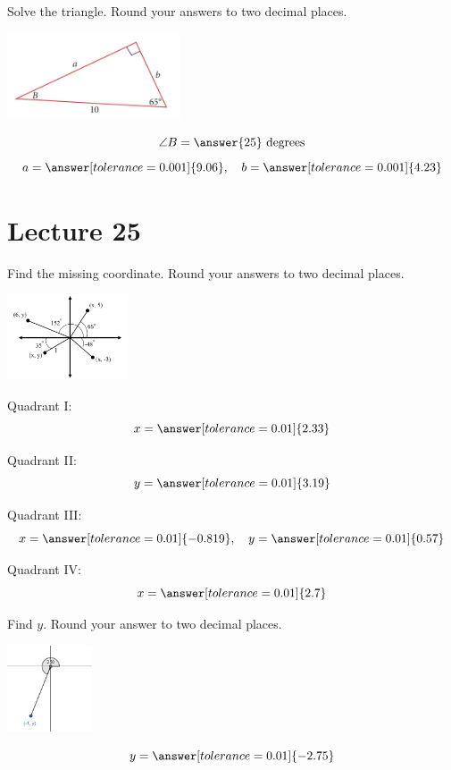 \documentclass{ximera}
\begin{document}
\begin{problem}\label{prob:160hom10prob6}
Solve the triangle. Round your answers to two decimal places.
\begin{image}
   
\includegraphics[height=1in]{160H10pic4.jpg}~
 
\end{image}

$$\angle B=\answer{25}\mbox{ degrees}$$
$$a=\answer[tolerance=0.001]{9.06},\quad b=\answer[tolerance=0.001]{4.23}$$
\end{problem}

\section{Lecture 25}

\begin{problem}\label{prob:160hom10prob7}
Find the missing coordinate.  Round your answers to two decimal places.
\begin{image}
   
\includegraphics[height=1in]{160H10pic2.jpg}~
 
\end{image}

Quadrant I:
$$x=\answer[tolerance=0.01]{2.33}$$

Quadrant II:
$$y=\answer[tolerance=0.01]{3.19}$$

Quadrant III:
$$x=\answer[tolerance=0.01]{-0.819},\quad y=\answer[tolerance=0.01]{0.57}$$

Quadrant IV:
$$x=\answer[tolerance=0.01]{2.7}$$
\end{problem}

\begin{problem}\label{prob:160hom10prob8}
Find $y$.  Round your answer to two decimal places.
 
 \begin{image}
   
\includegraphics[height=1in]{160H10pic1.jpg}

\end{image}
$$y=\answer[tolerance=0.01]{-2.75}$$
\end{problem}
\end{document}
